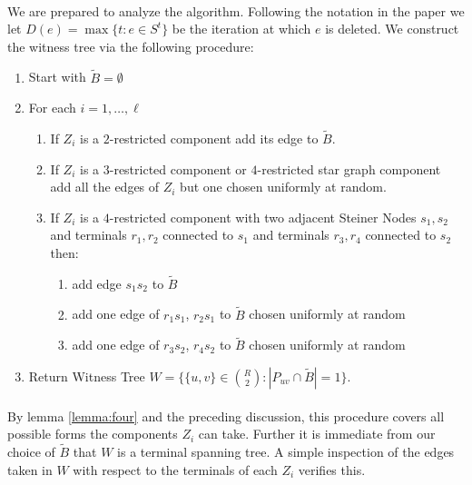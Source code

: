 \documentclass[letterpaper,12pt,oneside,onecolumn]{article}
\begin{document}
\paragraph{}
We are prepared to analyze the algorithm. Following the notation in the paper we let $D(e) = \max\{t : e \in S^t\}$ be the iteration at which $e$ is deleted. We construct the witness tree via the following procedure:
\begin{enumerate}
\item Start with $\tilde{B} = \emptyset$
\item For each $i = 1,\dots, \ell$
	\begin{enumerate}
	\item If $Z_i$ is a $2$-restricted component add its edge to $\tilde{B}$.
	\item If $Z_i$ is a $3$-restricted component or $4$-restricted star graph component add all the edges of $Z_i$ but one chosen uniformly at random.
	\item If $Z_i$ is a $4$-restricted component with two adjacent Steiner Nodes $s_1,s_2$ and terminals $r_1, r_2$ connected to $s_1$ and terminals $r_3,r_4$ connected to $s_2$ then:
	\begin{enumerate}
		 \item add edge $s_1s_2$ to $\tilde{B}$
		 \item add one edge of $r_1s_1$, $r_2s_1$ to $\tilde{B}$ chosen uniformly at random
		 \item add one edge of $r_3s_2$, $r_4s_2$ to $\tilde{B}$ chosen uniformly at random
\end{enumerate}
	\end{enumerate}
\item Return Witness Tree $W= \{\{u,v\} \in {R\choose 2} : |P_{uv} \cap \tilde{B}| = 1\}$.
\end{enumerate}
\paragraph{}
By lemma \ref{lemma:four} and the preceding discussion, this procedure covers all possible forms the components $Z_i$ can take. Further it is immediate from our choice of $\tilde{B}$ that $W$ is a terminal spanning tree. A simple inspection of the edges taken in $W$ with respect to the terminals of each $Z_i$ verifies this.
\end{document}
